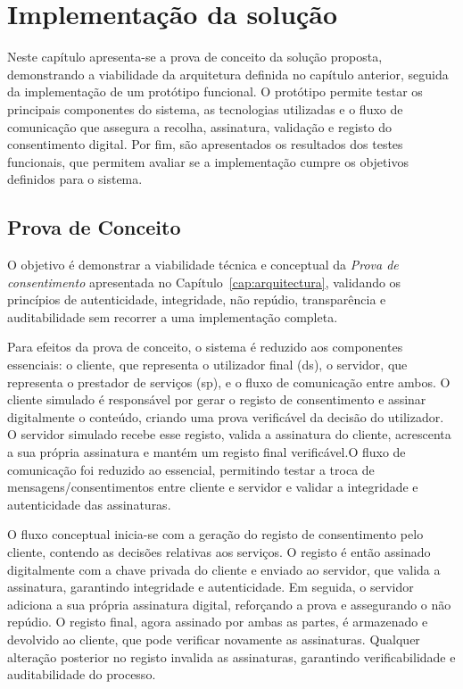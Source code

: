 \chapter{Implementação da solução}
\label{cap:implementacao}

Neste capítulo apresenta-se a prova de conceito da solução proposta, demonstrando a viabilidade da arquitetura definida no capítulo anterior, seguida da implementação de um protótipo funcional. O protótipo permite testar os principais componentes do sistema, as tecnologias utilizadas e o fluxo de comunicação que assegura a recolha, assinatura, validação e registo do consentimento digital. Por fim, são apresentados os resultados dos testes funcionais, que permitem avaliar se a implementação cumpre os objetivos definidos para o sistema.

\section{Prova de Conceito}

O objetivo é demonstrar a viabilidade técnica e conceptual da \textit{Prova de consentimento} apresentada no Capítulo~\ref{cap:arquitectura}, validando os princípios de autenticidade, integridade, não repúdio, transparência e auditabilidade sem recorrer a uma implementação completa.

Para efeitos da prova de conceito, o sistema é reduzido aos componentes essenciais: o cliente, que representa o utilizador final (\acrshort{ds}), o servidor, que representa o prestador de serviços (\acrshort{sp}), e o fluxo de comunicação entre ambos. O cliente simulado é responsável por gerar o registo de consentimento e assinar digitalmente o conteúdo, criando uma prova verificável da decisão do utilizador. O servidor simulado recebe esse registo, valida a assinatura do cliente, acrescenta a sua própria assinatura e mantém um registo final verificável.O fluxo de comunicação foi reduzido ao essencial, permitindo testar a troca de mensagens/consentimentos entre cliente e servidor e validar a integridade e autenticidade das assinaturas.

O fluxo conceptual inicia-se com a geração do registo de consentimento pelo cliente, contendo as decisões relativas aos serviços. O registo é então assinado digitalmente com a chave privada do cliente e enviado ao servidor, que valida a assinatura, garantindo integridade e autenticidade. Em seguida, o servidor adiciona a sua própria assinatura digital, reforçando a prova e assegurando o não repúdio. O registo final, agora assinado por ambas as partes, é armazenado e devolvido ao cliente, que pode verificar novamente as assinaturas. Qualquer alteração posterior no registo invalida as assinaturas, garantindo verificabilidade e auditabilidade do processo.

